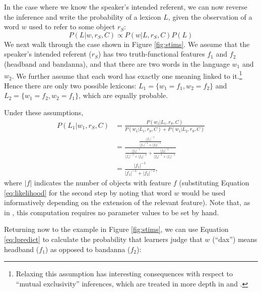 \documentclass[man,noapacite]{apa2}
\begin{document}
In the case where we know the speaker's intended referent, we can now reverse the inference and write the probability of a lexicon $L$, given the observation of a word $w$ used to refer to some object $r_S$:
\begin{equation}
\label{eq:learner}
P(L | w, r_S, C) \propto P(w | L, r_S, C) P(L)
\end{equation}
We next walk through the case shown in Figure \ref{fig:stims}. We assume that the speaker's intended referent ($r_S$) has two truth-functional features $f_{1}$ and $f_{2}$ ({\sc headband} and {\sc bandanna}), and that there are two words in the language $w_{1}$ and $w_{2}$. We further assume that each word has exactly one meaning linked to it.\footnote{Relaxing this assumption has interesting consequences with respect to ``mutual exclusivity'' inferences, which are treated in more depth in  and .} Hence there are only two possible lexicons: $L_{1}=\{w_{1}{=}f_{1}, w_{2}{=}f_{2}\}$ and $L_{2}=\{w_{1}{=}f_{2}, w_{2}{=}f_{1}\}$, which are equally probable. 

Under these assumptions, 
\begin{equation}
\begin{split}
\label{eq:lpredict}
P(L_{1} | w_{1}, r_S, C) 
&= \frac{P(w_{1} | L_{1}, r_S, C)}{P(w_{1} | L_{1}, r_S, C) + P(w_{1} | L_{2}, r_S, C)} \\
&= \frac{ \frac{ |f_{1}|^{-1}}{|f_{1}|^{-1} + |f_{2}|^{-1}}}
       { \frac{ |f_{1}|^{-1}}{|f_{1}|^{-1} + |f_{2}|^{-1}}  +  \frac{ |f_{2}|^{-1}}{|f_{2}|^{-1} + |f_{1}|^{-1}}} \\
&= \frac{ |f_{1}|^{-1}}
       { |f_{1}|^{-1}  +  |f_{2}|^{-1} }, 
\end{split}
\end{equation}
where $|f|$ indicates the number of objects with feature $f$ (substituting Equation \ref{eq:likelihood} for the second step by noting that word $w$ would be used informatively depending on the extension of the relevant feature). Note that, as in , this computation requires no parameter values to be set by hand.

Returning now to the example in Figure \ref{fig:stims}, we can use Equation \ref{eq:lpredict} to calculate the probability that learners judge that $w$ (``dax'') means {\sc headband} ($f_1$) as opposed to {\sc bandanna} ($f_2$):
\end{document}
